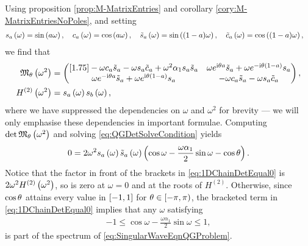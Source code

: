 Using proposition \ref{prop:M-MatrixEntries} and corollary \ref{cory:M-MatrixEntriesNoPoles}, and setting
\begin{align*}
	s_a\left( \omega \right) &= \sin\left( a\omega \right), \quad c_a\left( \omega \right) = \cos\left( a\omega \right), 
	\quad \tilde{s}_a\left( \omega \right) = \sin\left( (1-a)\omega \right), \quad \tilde{c}_a\left( \omega \right) = \cos\left( (1-a)\omega \right),
\end{align*} 
we find that
\begin{align*}
	\mathfrak{M}_{\theta}\left( \omega^2 \right) &= 
	\begin{pmatrix}[1.75]
		-\omega c_a \tilde{s}_a - \omega s_a \tilde{c}_{a} + \omega^2\alpha_1 s_a \tilde{s}_a &
		\omega e^{\mathrm{i}\theta a} \tilde{s}_a + \omega e^{-\mathrm{i}\theta(1-a)} s_a \\
		\omega e^{-\mathrm{i}\theta a} \tilde{s}_a + \omega e^{\mathrm{i}\theta(1-a)} s_a &
		-\omega c_a \tilde{s}_a - \omega s_a \tilde{c}_a
	\end{pmatrix}, \\
	H^{(2)}\left( \omega^2 \right) &= s_a\left( \omega \right) s_b\left( \omega \right),\\
\end{align*}
where we have suppressed the dependencies on $\omega$ and $\omega^2$ for brevity --- we will only emphasise these dependencies in important formulae.
Computing $\det\mathfrak{M}_{\theta}\left( \omega^2 \right)$ and solving \eqref{eq:QGDetSolveCondition} yields
\begin{align} \label{eq:1DChainDetEqual0}
	0 = 2\omega^2 s_a\left( \omega \right) \tilde{s}_a\left( \omega \right) \left(  \cos\omega - \frac{\omega\alpha_1}{2}\sin\omega - \cos\theta  \right).
\end{align}
Notice that the factor in front of the brackets in \eqref{eq:1DChainDetEqual0} is $2\omega^2 H^{(2)}\left( \omega^2 \right)$, so is zero at $\omega=0$ and at the roots of $H^{(2)}$.
Otherwise, since $\cos\theta$ attains every value in $\left[ -1,1 \right]$ for $\theta\in\left[-\pi,\pi\right)$, the bracketed term in \eqref{eq:1DChainDetEqual0} implies that any $\omega$ satisfying
\begin{align*}
	-1 \leq \cos\omega - \frac{\omega\alpha_1}{2}\sin\omega \leq 1,
\end{align*}
is part of the spectrum of \eqref{eq:SingularWaveEqnQGProblem}.

